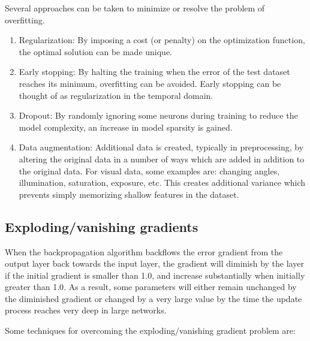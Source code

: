 \documentclass[english, bibtex]{kththesis}
\begin{document}
Several approaches can be taken to minimize or resolve the problem of overfitting.
\begin{enumerate}
\item Regularization\cite{10.1038/317314a0}: By imposing a cost (or penalty) on the optimization function, the optimal solution can be made unique.
\item Early stopping\cite{Prechelt2012}: By halting the training when the error of the test dataset reaches its minimum, overfitting can be avoided. Early stopping can be thought of as regularization in the temporal domain. 
\item Dropout\cite{JMLR:v15:srivastava14a}: By randomly ignoring some neurons during training to reduce the model complexity, an increase in model sparsity is gained. 
\item Data augmentation\cite{10.2307/2289457}: Additional data is created, typically in preprocessing, by altering the original data in a number of ways which are added in addition to the original data. For visual data, some examples are: changing angles, illumination, saturation, exposure, etc. This creates additional variance which prevents simply memorizing shallow features in the dataset.
\end{enumerate}

\subsection{Exploding/vanishing gradients}
When the backpropagation algorithm backflows the error gradient from the output layer back towards the input layer, the gradient will diminish by the layer if the initial gradient is smaller than 1.0, and increase substantially when initially greater than 1.0. As a result, some parameters will either remain unchanged by the diminished gradient or changed by a very large value by the time the update process reaches very deep in large networks.

Some techniques for overcoming the exploding/vanishing gradient problem are\cite{doi:10.1142/S0218488598000094}:
\end{document}

